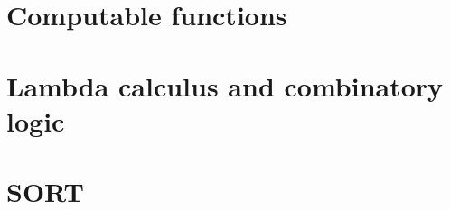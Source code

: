 \documentclass[oneside]{book}
\begin{document}
\part{Computable functions}











\part{Lambda calculus and combinatory logic}




\part{SORT}

\end{document}
